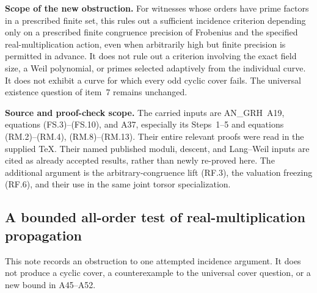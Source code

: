 \documentclass[11pt,a4paper]{article}
\theoremstyle{definition}
\renewcommand{\paragraph}[1]{\par\smallskip\noindent\textbf{#1}\quad\ignorespaces}
\begin{document}
\paragraph{Scope of the new obstruction.}
For witnesses whose orders have prime factors in a prescribed
finite set, this rules out a sufficient incidence criterion
depending only on a prescribed finite congruence precision of
Frobenius and the specified real-multiplication action, even
when arbitrarily high but finite precision is permitted in
advance.  It does
not rule out a criterion involving the exact field size, a
Weil polynomial, or primes selected adaptively from the
individual curve.  It does not exhibit a curve for which every
odd cyclic cover fails.  The universal existence question of
item~7 remains unchanged.

\paragraph{Source and proof-check scope.}
The carried inputs are AN\_GRH~A19, equations (FS.3)--(FS.10),
and A37, especially its Steps~1--5 and equations
(RM.2)--(RM.4), (RM.8)--(RM.13).  Their entire relevant
proofs were read in the supplied TeX.  Their named published
moduli, descent, and Lang--Weil inputs are cited as already
accepted results, rather than newly re-proved here.  The
additional argument is the arbitrary-congruence lift (RF.3),
the valuation freezing (RF.6), and their use in the same joint
torsor specialization.



\subsection{A bounded all-order test of real-multiplication propagation}
\label{sec:kt-rm-theta-propagation-limit}

This note records an obstruction to one attempted incidence argument.
It does not produce a cyclic cover, a counterexample to the universal
cover question, or a new bound in A45--A52.
\end{document}
